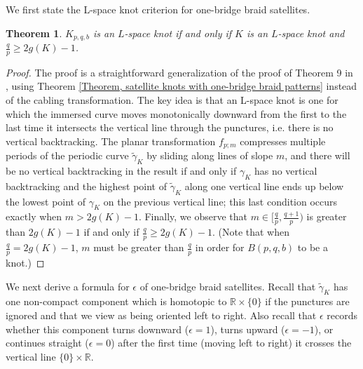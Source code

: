 \documentclass{amsart}
\newcommand{\R}{\mathbb{R}}
\newtheorem{thm}{Theorem}[section]
\theoremstyle{definition}
\theoremstyle{remark}
\numberwithin{equation}{section}
\numberwithin{equation}{section} \makeatletter
\begin{document}
We first state the L-space knot criterion for one-bridge braid satellites.
 \begin{thm}\label{Theorem, L space knot criterion}
 	$K_{p,q,b}$ is an $L$-space knot if and only if $K$ is an $L$-space knot and $\frac{q}{p}\geq 2g(K)-1$.
 \end{thm}   
 \begin{proof}
 The proof is a straightforward generalization of the proof of Theorem 9 in \cite{Hanselman2023}, using Theorem \ref{Theorem, satellite knots with one-bridge braid patterns} instead of the cabling transformation. The key idea is that an L-space knot is one for which the immersed curve moves monotonically downward from the first to the last time it intersects the vertical line through the punctures, i.e. there is no vertical backtracking. The planar transformation $f_{p;m}$ compresses multiple periods of the periodic curve $\tilde \gamma_K$ by sliding along lines of slope $m$, and there will be no vertical backtracking in the result if and only if $\gamma_K$ has no vertical backtracking and the highest point of $\tilde \gamma_K$ along one vertical line ends up below the lowest point of $\gamma_K$ on the  previous vertical line; this last condition occurs exactly when $m > 2g(K) - 1$. Finally, we observe that $m \in [\frac{q}{p}, \frac{q+1}{p})$ is greater than $2g(K)-1$ if and only if $\frac{q}{p} \geq 2g(K) - 1$. (Note that when $\frac{q}{p} = 2g(K) - 1$, $m$ must be greater than $\frac{q}{p}$ in order for $B(p,q,b)$ to be a knot.)
 \end{proof}
 
 We next derive a formula for $\epsilon$ of one-bridge braid satellites. Recall that $\tilde\gamma_K$ has one non-compact component which is homotopic to $\R\times\{0\}$ if the punctures are ignored and that we view as being oriented left to right. Also recall that $\epsilon$ records whether this component turns downward ($\epsilon = 1$), turns upward ($\epsilon = -1$), or continues straight ($\epsilon = 0$) after the first time (moving left to right) it crosses the vertical line $\{0\}\times \R$.
  
\end{document}
